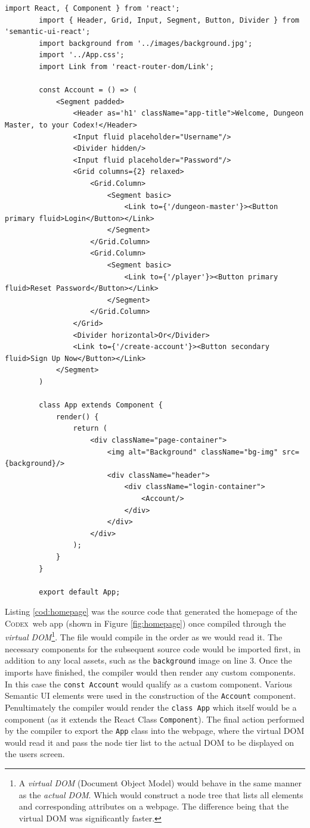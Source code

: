 \documentclass[final]{cmpreport}
\newcommand{\Codex}{\textsc{Codex}}
\begin{document}
		\begin{lstlisting}[caption={ReactJS source code which generated the GUI for the homepage for the \Codex \ web app}, label={cod:homepage}]
		import React, { Component } from 'react';
		import { Header, Grid, Input, Segment, Button, Divider } from 'semantic-ui-react';
		import background from '../images/background.jpg';
		import '../App.css';
		import Link from 'react-router-dom/Link';
		
		const Account = () => (
			<Segment padded>
				<Header as='h1' className="app-title">Welcome, Dungeon Master, to your Codex!</Header>
				<Input fluid placeholder="Username"/>
				<Divider hidden/>
				<Input fluid placeholder="Password"/>
				<Grid columns={2} relaxed>
					<Grid.Column>
						<Segment basic>
							<Link to={'/dungeon-master'}><Button primary fluid>Login</Button></Link>
						</Segment>
					</Grid.Column>
					<Grid.Column>
						<Segment basic>
							<Link to={'/player'}><Button primary fluid>Reset Password</Button></Link>
						</Segment>
					</Grid.Column>
				</Grid>
				<Divider horizontal>Or</Divider>
				<Link to={'/create-account'}><Button secondary fluid>Sign Up Now</Button></Link>
			</Segment>
		)
		
		class App extends Component {
			render() {
				return (
					<div className="page-container">
						<img alt="Background" className="bg-img" src={background}/>
						<div className="header">
							<div className="login-container">
								<Account/>
							</div>
						</div>
					</div>
				);
			}
		}
		
		export default App;
		\end{lstlisting}
		
		Listing \ref{cod:homepage} was the source code that generated the homepage of the \Codex \ web app (shown in Figure \ref{fig:homepage}) once compiled through the \emph{virtual DOM}\footnote{A \emph{virtual DOM} (Document Object Model) would behave in the same manner as the \emph{actual DOM}. Which would construct a node tree that lists all elements and corresponding attributes on a webpage. The difference being that the virtual DOM was significantly faster.}. The file would compile in the order as we would read it. The necessary components for the subsequent source code would be imported first, in addition to any local assets, such as the \texttt{background} image on line 3. Once the imports have finished, the compiler would then render any custom components. In this case the \texttt{const Account} would qualify as a custom component. Various Semantic UI elements were used in the construction of the \texttt{Account} component. Penultimately the compiler would render the \texttt{class App} which itself would be a component (as it extends the React Class \texttt{Component}). The final action performed by the compiler to export the \texttt{App} class into the webpage, where the virtual DOM would read it and pass the node tier list to the actual DOM to be displayed on the users screen.
		
\end{document}
